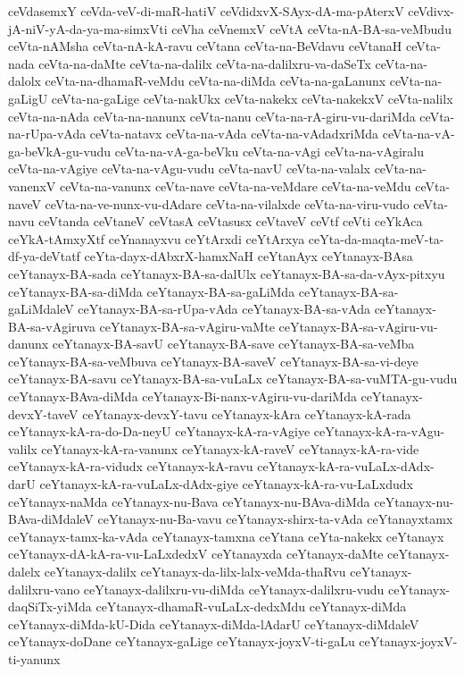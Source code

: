 {ceVdasemxY
ceVda-veV-di-maR-hatiV
ceVdidxvX-SAyx-dA-ma-pAterxV
ceVdivx-jA-niV-yA-da-ya-ma-simxVti
ceVha
ceVnemxV
ceVtA
ceVta-nA-BA-sa-veMbudu
ceVta-nAMsha
ceVta-nA-kA-ravu
ceVtana
ceVta-na-BeVdavu
ceVtanaH
ceVta-nada
ceVta-na-daMte
ceVta-na-dalilx
ceVta-na-dalilxru-va-daSeTx
ceVta-na-dalolx
ceVta-na-dhamaR-veMdu
ceVta-na-diMda
ceVta-na-gaLanunx
ceVta-na-gaLigU
ceVta-na-gaLige
ceVta-nakUkx
ceVta-nakekx
ceVta-nakekxV
ceVta-nalilx
ceVta-na-nAda
ceVta-na-nanunx
ceVta-nanu
ceVta-na-rA-giru-vu-dariMda
ceVta-na-rUpa-vAda
ceVta-natavx
ceVta-na-vAda
ceVta-na-vAdadxriMda
ceVta-na-vA-ga-beVkA-gu-vudu
ceVta-na-vA-ga-beVku
ceVta-na-vAgi
ceVta-na-vAgiralu
ceVta-na-vAgiye
ceVta-na-vAgu-vudu
ceVta-navU
ceVta-na-valalx
ceVta-na-vanenxV
ceVta-na-vanunx
ceVta-nave
ceVta-na-veMdare
ceVta-na-veMdu
ceVta-naveV
ceVta-na-ve-nunx-vu-dAdare
ceVta-na-vilalxde
ceVta-na-viru-vudo
ceVta-navu
ceVtanda
ceVtaneV
ceVtasA
ceVtasusx
ceVtaveV
ceVtf
ceVti
ceYkAca
ceYkA-tAmxyXtf
ceYnanayxvu
ceYtArxdi
ceYtArxya
ceYta-da-maqta-meV-ta-df-ya-deVtatf
ceYta-dayx-dAbxrX-hamxNaH
ceYtanAyx
ceYtanayx-BAsa
ceYtanayx-BA-sada
ceYtanayx-BA-sa-dalUlx
ceYtanayx-BA-sa-da-vAyx-pitxyu
ceYtanayx-BA-sa-diMda
ceYtanayx-BA-sa-gaLiMda
ceYtanayx-BA-sa-gaLiMdaleV
ceYtanayx-BA-sa-rUpa-vAda
ceYtanayx-BA-sa-vAda
ceYtanayx-BA-sa-vAgiruva
ceYtanayx-BA-sa-vAgiru-vaMte
ceYtanayx-BA-sa-vAgiru-vu-danunx
ceYtanayx-BA-savU
ceYtanayx-BA-save
ceYtanayx-BA-sa-veMba
ceYtanayx-BA-sa-veMbuva
ceYtanayx-BA-saveV
ceYtanayx-BA-sa-vi-deye
ceYtanayx-BA-savu
ceYtanayx-BA-sa-vuLaLx
ceYtanayx-BA-sa-vuMTA-gu-vudu
ceYtanayx-BAva-diMda
ceYtanayx-Bi-nanx-vAgiru-vu-dariMda
ceYtanayx-devxY-taveV
ceYtanayx-devxY-tavu
ceYtanayx-kAra
ceYtanayx-kA-rada
ceYtanayx-kA-ra-do-Da-neyU
ceYtanayx-kA-ra-vAgiye
ceYtanayx-kA-ra-vAgu-valilx
ceYtanayx-kA-ra-vanunx
ceYtanayx-kA-raveV
ceYtanayx-kA-ra-vide
ceYtanayx-kA-ra-vidudx
ceYtanayx-kA-ravu
ceYtanayx-kA-ra-vuLaLx-dAdx-darU
ceYtanayx-kA-ra-vuLaLx-dAdx-giye
ceYtanayx-kA-ra-vu-LaLxdudx
ceYtanayx-naMda
ceYtanayx-nu-Bava
ceYtanayx-nu-BAva-diMda
ceYtanayx-nu-BAva-diMdaleV
ceYtanayx-nu-Ba-vavu
ceYtanayx-shirx-ta-vAda
ceYtanayxtamx
ceYtanayx-tamx-ka-vAda
ceYtanayx-tamxna
ceYtana
ceYta-nakekx
ceYtanayx
ceYtanayx-dA-kA-ra-vu-LaLxdedxV
ceYtanayxda
ceYtanayx-daMte
ceYtanayx-dalelx
ceYtanayx-dalilx
ceYtanayx-da-lilx-lalx-veMda-thaRvu
ceYtanayx-dalilxru-vano
ceYtanayx-dalilxru-vu-diMda
ceYtanayx-dalilxru-vudu
ceYtanayx-daqSiTx-yiMda
ceYtanayx-dhamaR-vuLaLx-dedxMdu
ceYtanayx-diMda
ceYtanayx-diMda-kU-Dida
ceYtanayx-diMda-lAdarU
ceYtanayx-diMdaleV
ceYtanayx-doDane
ceYtanayx-gaLige
ceYtanayx-joyxV-ti-gaLu
ceYtanayx-joyxV-ti-yanunx
}
